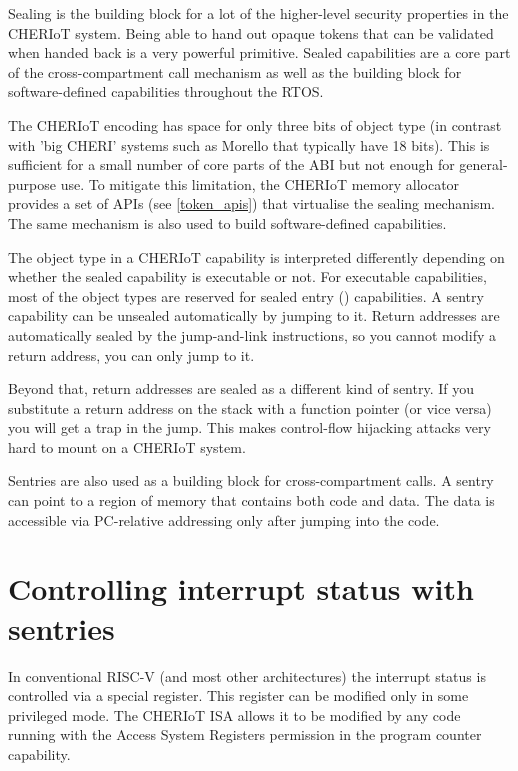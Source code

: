 Sealing is the building block for a lot of the higher-level security properties in the CHERIoT system.
Being able to hand out opaque tokens that can be validated when handed back is a very powerful primitive.
Sealed capabilities are a core part of the cross-compartment call mechanism as well as the building block for software-defined capabilities throughout the RTOS.

The CHERIoT encoding has space for only three bits of object type (in contrast with 'big CHERI' systems such as Morello that typically have 18 bits).
This is sufficient for a small number of core parts of the ABI but not enough for general-purpose use.
To mitigate this limitation, the CHERIoT memory allocator provides a set of APIs (see \ref{token_apis}) that virtualise the sealing mechanism.
The same mechanism is also used to build software-defined capabilities.

The object type in a CHERIoT capability is interpreted differently depending on whether the sealed capability is executable or not.
For executable capabilities, most of the object types are reserved for sealed entry () capabilities.
A sentry capability can be unsealed automatically by jumping to it.
Return addresses are automatically sealed by the jump-and-link instructions, so you cannot modify a return address, you can only jump to it.

Beyond that, return addresses are sealed as a different kind of sentry.
If you substitute a return address on the stack with a function pointer (or vice versa) you will get a trap in the jump.
This makes control-flow hijacking attacks very hard to mount on a CHERIoT system.

Sentries are also used as a building block for cross-compartment calls.
A sentry can point to a region of memory that contains both code and data.
The data is accessible via PC-relative addressing only after jumping into the code.

\section[label=interrupt_sentries]{Controlling interrupt status with sentries}

In conventional RISC-V (and most other architectures) the interrupt status is controlled via a special register.
This register can be modified only in some privileged mode.
The CHERIoT ISA allows it to be modified by any code running with the Access System Registers permission in the program counter capability.

